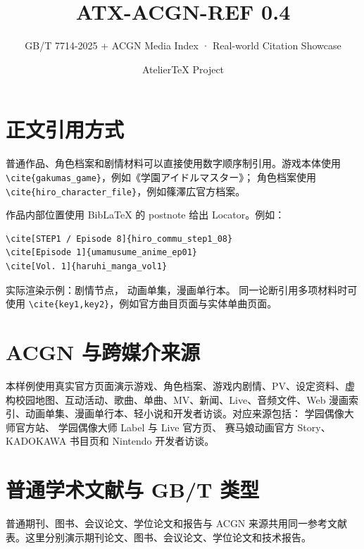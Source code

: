 \documentclass[profile=editorial]{atelier}
\title{ATX-ACGN-REF 0.4}
\subtitle{GB/T 7714-2025 + ACGN Media Index · Real-world Citation Showcase}
\author{AtelierTeX Project}
\begin{document}
\maketitle

\section{正文引用方式}

普通作品、角色档案和剧情材料可以直接使用数字顺序制引用。游戏本体使用
\verb|\cite{gakumas_game}|，例如《学園アイドルマスター》\cite{gakumas_game}；
角色档案使用 \verb|\cite{hiro_character_file}|，例如篠澤広官方档案\cite{hiro_character_file}。

作品内部位置使用 BibLaTeX 的 postnote 给出 Locator。例如：

\begin{verbatim}
\cite[STEP1 / Episode 8]{hiro_commu_step1_08}
\cite[Episode 1]{umamusume_anime_ep01}
\cite[Vol. 1]{haruhi_manga_vol1}
\end{verbatim}

实际渲染示例：剧情节点\cite[STEP1 / Episode 8]{hiro_commu_step1_08}，
动画单集\cite[Episode 1]{umamusume_anime_ep01}，漫画单行本\cite[Vol. 1]{haruhi_manga_vol1}。
同一论断引用多项材料时可使用 \verb|\cite{key1,key2}|，例如官方曲目页面与实体单曲页面\cite{hiro_song_koukei,hiro_1st_single}。

\section{ACGN 与跨媒介来源}

本样例使用真实官方页面演示游戏、角色档案、游戏内剧情、PV、设定资料、虚构校园地图、互动活动、歌曲、单曲、MV、新闻、Live、音频文件、Web 漫画索引、动画单集、漫画单行本、轻小说和开发者访谈。对应来源包括：
学园偶像大师官方站\cite{hiro_character_pv,hatsuboshi_schoolguide,hatsuboshi_campus_map,hatsuboshi_entrance_exam,gakumas_comics_index}、
学园偶像大师 Label 与 Live 官方页\cite{gakumas_mv_news,gakumas_first_single_news,gakumas_debut_live_hatsukoi,gakumas_audio_instrumental}、
赛马娘动画官方 Story\cite{umamusume_anime_ep01}、KADOKAWA 书目页\cite{haruhi_manga_vol1,haruhi_novel_vol1}和 Nintendo 开发者访谈\cite{mario_wonder_developer_interview}。

\section{普通学术文献与 GB/T 类型}

普通期刊、图书、会议论文、学位论文和报告与 ACGN 来源共用同一参考文献表。这里分别演示期刊论文\cite{mnih2015dqn}、图书\cite{sutton_barto_2018}、会议论文\cite{vaswani2017attention}、学位论文\cite{vanhorn2019visipedia}和技术报告\cite{nist_ai_rmf_2023}。
\end{document}
